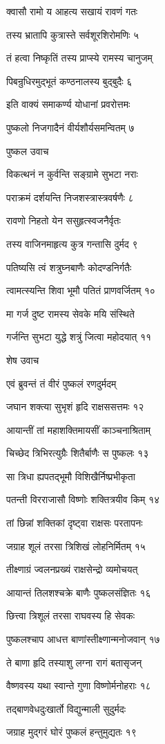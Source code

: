क्वासौ रामो य आहत्य सखायं रावणं गतः

तस्य भ्रातापि कुत्रास्ते सर्वशूरशिरोमणिः ५

तं हत्वा निष्कृतिं तस्य प्राप्स्ये रामस्य चानुजम्

पिबन्रुधिरमुद्भूतं कण्ठनालस्य बुद्बुदैः ६

इति वाक्यं समाकर्ण्य योधानां प्रवरोत्तमः

पुष्कलो निजगादैनं वीर्यशौर्यसमन्वितम् ७

पुष्कल उवाच

विकत्थनं न कुर्वन्ति सङ्ग्रामे सुभटा नराः

पराक्रमं दर्शयन्ति निजशस्त्रास्त्रवर्षणैः ८

रावणो निहतो येन ससुहृत्स्वजनैर्वृतः

तस्य वाजिनमाहृत्य कुत्र गन्तासि दुर्मद ९

पतिष्यसि त्वं शत्रुघ्नबाणैः कोदण्डनिर्गतैः

त्वामत्स्यन्ति शिवा भूमौ पतितं प्राणवर्जितम् १०

मा गर्ज दुष्ट रामस्य सेवके मयि संस्थिते

गर्जन्ति सुभटा युद्धे शत्रुं जित्वा महोदयात् ११

शेष उवाच

एवं ब्रुवन्तं तं वीरं पुष्कलं रणदुर्मदम्

जघान शक्त्या सुभृशं हृदि राक्षससत्तमः १२

आयान्तीं तां महाशक्तिमायसीं काञ्चनाश्रिताम्

चिच्छेद त्रिभिरत्युग्रैः शितैर्बाणैः स पुष्कलः १३

सा त्रिधा ह्यपतद्भूमौ विशिखैर्निष्प्रभीकृता

पतन्ती विरराजासौ विष्णोः शक्तित्रयीव किम् १४

तां छिन्नां शक्तिकां दृष्ट्वा राक्षसः परतापनः

जग्राह शूलं तरसा त्रिशिखं लोहनिर्मितम् १५

तीक्ष्णाग्रं ज्वलनप्रख्यं राक्षसेन्द्रो व्यमोचयत्

आयान्तं तिलशश्चक्रे बाणैः पुष्कलसंज्ञितः १६

छित्त्वा त्रिशूलं तरसा राघवस्य हि सेवकः

पुष्कलश्चाप आधत्त बाणांस्तीक्ष्णान्मनोजवान् १७

ते बाणा हृदि तस्याशु लग्ना रागं बतासृजन्

वैष्णवस्य यथा स्वान्ते गुणा विष्णोर्मनोहराः १८

तद्बाणवेधदुःखार्तो विद्युन्माली सुदुर्मदः

जग्राह मुद्गरं घोरं पुष्कलं हन्तुमुद्यतः १९


